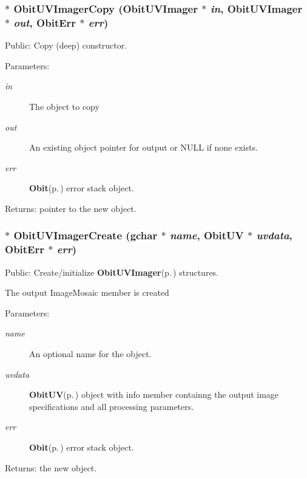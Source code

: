 \subsubsection{$\ast$ Obit\-UVImager\-Copy ({\bf Obit\-UVImager} $\ast$ {\em in}, {\bf Obit\-UVImager} $\ast$ {\em out}, {\bf Obit\-Err} $\ast$ {\em err})}\label{ObitUVImager_8h_a15}


Public: Copy (deep) constructor. 

\begin{Desc}
\item[Parameters:]
\begin{description}
\item[{\em in}]The object to copy \item[{\em out}]An existing object pointer for output or NULL if none exists. \item[{\em err}]{\bf Obit}{\rm (p.\,\pageref{structObit})} error stack object. \end{description}
\end{Desc}
\begin{Desc}
\item[Returns:]pointer to the new object. \end{Desc}
\subsubsection{$\ast$ Obit\-UVImager\-Create (gchar $\ast$ {\em name}, {\bf Obit\-UV} $\ast$ {\em uvdata}, {\bf Obit\-Err} $\ast$ {\em err})}\label{ObitUVImager_8h_a17}


Public: Create/initialize {\bf Obit\-UVImager}{\rm (p.\,\pageref{structObitUVImager})} structures. 

The output Image\-Mosaic member is created \begin{Desc}
\item[Parameters:]
\begin{description}
\item[{\em name}]An optional name for the object. \item[{\em uvdata}]{\bf Obit\-UV}{\rm (p.\,\pageref{structObitUV})} object with info member containng the output image specifications and all processing parameters. \item[{\em err}]{\bf Obit}{\rm (p.\,\pageref{structObit})} error stack object. \end{description}
\end{Desc}
\begin{Desc}
\item[Returns:]the new object. \end{Desc}
